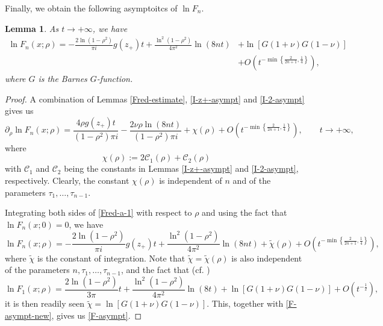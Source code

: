 \documentclass[11pt,a4paper]{article}
\newtheorem{lemma}[thm]{Lemma}
\numberwithin{equation}{section}
\begin{document}
Finally, we obtain the following asymptoitcs of $\ln{F}_n$.
\begin{lemma}
As $t\to+\infty$, we have
\begin{align}\label{F-asympt}
\ln{F}_n(x;\rho)=
-\frac{2\ln(1-\rho^2)}{\pi{i}}g(z_+)t+\frac{\ln^2(1-\rho^2)}{4\pi^2}\ln(8nt)
&+\ln\left[G(1+\nu)G(1-\nu)\right]\nonumber\\
&+O\left(t^{-\min\left\{\frac{2}{2n+1},\frac{1}{4}\right\}}\right),
\end{align}
where $G$ is the Barnes $G$-function.
\end{lemma}
\begin{proof}
A combination of Lemmas \ref{Fred-estimate}, \ref{I-z+-asympt} and \ref{I-2-asympt} gives us
\begin{equation}\label{Fred-a-1}
\partial_{\rho}\ln{F}_n(x;\rho)=
\frac{4\rho{g}(z_+)t}{(1-\rho^2)\pi{i}}-\frac{2\nu\rho\ln(8nt)}{(1-\rho^2)\pi i}
+\chi(\rho)+O\left(t^{-\min\left\{\frac{2}{2n+1},\frac{1}{4}\right\}}\right),
\qquad t\to+\infty,
\end{equation}
where
$$
\chi(\rho):=2\mathcal{C}_1(\rho)+\mathcal{C}_2(\rho)
$$
with $\mathcal{C}_1$ and $\mathcal{C}_2$ being the constants in Lemmas \ref{I-z+-asympt} and \ref{I-2-asympt}, respectively.
Clearly, the constant $\chi(\rho)$
is independent of $n$ and of the parameters $\tau_1,\ldots,\tau_{n-1}$.

Integrating both sides of \eqref{Fred-a-1} with respect to $\rho$ and using the fact that $\ln F_n(x;0)=0$, we have
\begin{equation}\label{F-asympt-new}
\ln{F}_n(x;\rho)=
-\frac{2\ln(1-\rho^2)}{\pi{i}}g(z_+)t+\frac{\ln^2(1-\rho^2)}{4\pi^2}\ln(8nt)
+\widetilde{\chi}(\rho)+O\left(t^{-\min\left\{\frac{2}{2n+1},\frac{1}{4}\right\}}\right),
\end{equation}
where $\widetilde{\chi}$ is the constant of integration. Note that $\widetilde{\chi}=\widetilde{\chi}(\rho)$ is also independent of the parameters $n,\tau_1,\ldots,\tau_{n-1}$, and the fact that
(cf. \cite{BB2018,BIP2019})
\begin{equation}\label{F-2}
\ln{F}_1(x;\rho)=
\frac{2\ln(1-\rho^2)}{3\pi}t+\frac{\ln^2(1-\rho^2)}{4\pi^2}\ln(8t)
+\ln[G(1+\nu)G(1-\nu)]+O\left(t^{-\frac{1}{2}}\right),
\end{equation}
it is then readily seen $\widetilde{\chi}=\ln[G(1+\nu)G(1-\nu)]$. This, together with \eqref{F-asympt-new}, gives us \eqref{F-asympt}.
%
 \end{proof}
\end{document}
